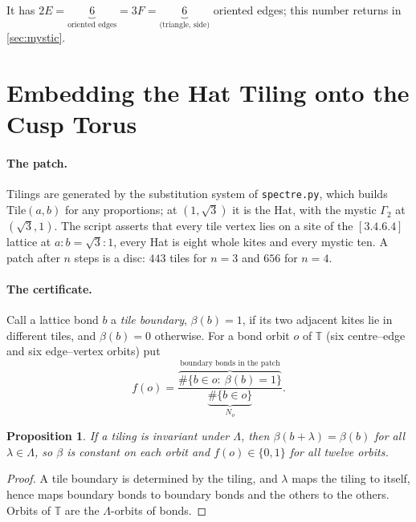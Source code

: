 \documentclass[11pt,a4paper]{article}
\newcommand{\TT}{\mathbb{T}}
\newcommand{\Lam}{\Lambda}
\theoremstyle{plain}
\newtheorem{proposition}{Proposition}
\theoremstyle{definition}
\begin{document}
It has $2E=\underbrace{6}_{\text{oriented edges}}=3F=\underbrace{6}_{\text{(triangle, side)}}$
oriented edges; this number returns in \cref{sec:mystic}.


\section{Embedding the Hat Tiling onto the Cusp Torus}
\label{sec:rollup}

\paragraph{The patch.} Tilings are generated by the substitution system of
\texttt{spectre.py}, which builds $\mathrm{Tile}(a,b)$ for any proportions; at
$(1,\sqrt3)$ it is the Hat, with the mystic $\Gamma_2$ at $(\sqrt3,1)$. The
script asserts that every tile vertex lies on a site of the $[3.4.6.4]$ lattice
at $a:b=\sqrt3:1$, every Hat is eight whole kites and every mystic ten. A patch
after $n$ steps is a disc: $443$ tiles for $n=3$ and $656$ for $n=4$.

\paragraph{The certificate.} Call a lattice bond $b$ a \emph{tile boundary},
$\beta(b)=1$, if its two adjacent kites lie in different tiles, and $\beta(b)=0$
otherwise. For a bond orbit $o$ of $\TT$ (six centre--edge and six edge--vertex
orbits) put
\begin{equation}
  f(o)=\frac{\overbrace{\#\{b\in o:\ \beta(b)=1\}}^{\text{boundary bonds in the patch}}}
  {\underbrace{\#\{b\in o\}}_{N_o}} .
\end{equation}

\begin{proposition}
\label{prop:descent}
If a tiling is invariant under $\Lam$, then $\beta(b+\lambda)=\beta(b)$ for all
$\lambda\in\Lam$, so $\beta$ is constant on each orbit and $f(o)\in\{0,1\}$ for
all twelve orbits.
\end{proposition}
\begin{proof}
A tile boundary is determined by the tiling, and $\lambda$ maps the tiling to
itself, hence maps boundary bonds to boundary bonds and the others to the others.
Orbits of $\TT$ are the $\Lam$-orbits of bonds.
\end{proof}
\end{document}
